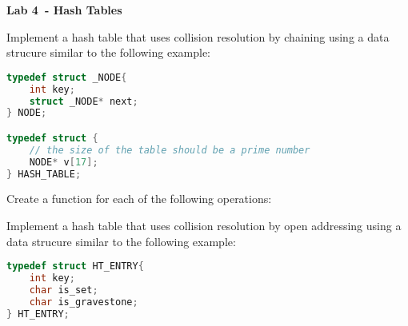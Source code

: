 \documentclass{exam}
\newcommand\labnr{4}
\newcommand\lab{Lab \labnr\ - Hash Tables}
\newcommand\lvlez{$\bigstar$}
\newcommand\lvlmed{\lvlez\lvlez}
\begin{document}
\begin{center}
    \vspace*{0cm}
    \bfseries\LARGE
    \lab
    \vspace*{1cm}
\end{center}


\begin{questions}
\question Implement a hash table that uses collision resolution by chaining using a data strucure similar to the following example:

\begin{lstlisting}[language=C]
typedef struct _NODE{
    int key;
    struct _NODE* next;
} NODE;

typedef struct {
    // the size of the table should be a prime number 
    NODE* v[17];
} HASH_TABLE;
\end{lstlisting}



Create a function for each of the following operations:

\question Implement a hash table that uses collision resolution by open addressing using a data strucure similar to the following example:

\begin{lstlisting}[language=C]
typedef struct HT_ENTRY{
    int key;
    char is_set;
    char is_gravestone;
} HT_ENTRY;


\end{lstlisting}
\end{questions}
\end{document}
